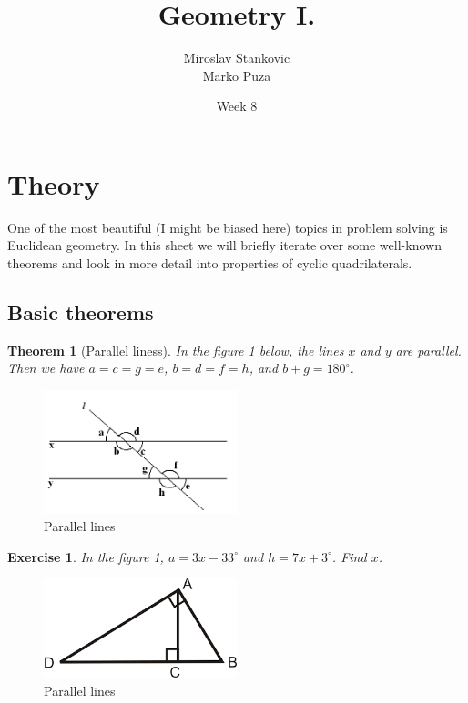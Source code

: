 \documentclass[11pt,a5paper]{article}
\title{\textbf{Geometry I.}}
\date{Week 8}
\author{Miroslav Stankovic\\ Marko Puza}
\newtheorem{exercise}{Exercise}
\newtheorem*{Theorem}{Theorem}
\begin{document}
\maketitle

\section{Theory}

\noindent One of the most beautiful (I might be biased here) topics in problem solving is Euclidean geometry. In this sheet we will briefly iterate over some well-known theorems and look in more detail into properties of cyclic quadrilaterals.

\subsection*{Basic theorems}

\begin{Theorem}[Parallel liness]
	In the figure 1 below, the lines $x$ and $y$ are parallel. Then we have  $a=c=g=e$, $b=d=f=h$, and $b+g = 180^{\circ}$.
\end{Theorem}

\begin{figure}[h] \begin{center}
\includegraphics[width=0.5\textwidth]{parallel}
\caption{Parallel lines}
\end{center} \end{figure}

\begin{exercise} In the figure 1, $a=3x-33^{\circ}$ and $h=7x+3^{\circ}$. Find $x$.
\end{exercise}


\begin{figure}[h] \begin{center}
\includegraphics[width=0.5\textwidth]{right}
\caption{Parallel lines}
\end{center} \end{figure}
\end{document}

